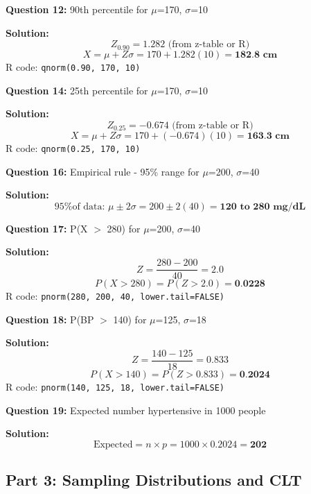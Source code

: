 \documentclass[11pt]{article}
\begin{document}
\textbf{Question 12:} 90th percentile for $\mu$=170, $\sigma$=10

\textcolor{correctgreen}{\textbf{Solution:}}
$$Z_{0.90} = 1.282 \text{ (from z-table or R)}$$
$$X = \mu + Z\sigma = 170 + 1.282(10) = \textbf{182.8 cm}$$
R code: \texttt{qnorm(0.90, 170, 10)}

\vspace{0.5cm}

\textbf{Question 14:} 25th percentile for $\mu$=170, $\sigma$=10

\textcolor{correctgreen}{\textbf{Solution:}}
$$Z_{0.25} = -0.674 \text{ (from z-table or R)}$$
$$X = \mu + Z\sigma = 170 + (-0.674)(10) = \textbf{163.3 cm}$$
R code: \texttt{qnorm(0.25, 170, 10)}

\vspace{0.5cm}

\textbf{Question 16:} Empirical rule - 95\% range for $\mu$=200, $\sigma$=40

\textcolor{correctgreen}{\textbf{Solution:}}
$$\text{95\% of data: } \mu \pm 2\sigma = 200 \pm 2(40) = \textbf{120 to 280 mg/dL}$$

\vspace{0.5cm}

\textbf{Question 17:} P(X $>$ 280) for $\mu$=200, $\sigma$=40

\textcolor{correctgreen}{\textbf{Solution:}}
$$Z = \frac{280-200}{40} = 2.0$$
$$P(X > 280) = P(Z > 2.0) = \textbf{0.0228}$$
R code: \texttt{pnorm(280, 200, 40, lower.tail=FALSE)}

\vspace{0.5cm}

\textbf{Question 18:} P(BP $>$ 140) for $\mu$=125, $\sigma$=18

\textcolor{correctgreen}{\textbf{Solution:}}
$$Z = \frac{140-125}{18} = 0.833$$
$$P(X > 140) = P(Z > 0.833) = \textbf{0.2024}$$
R code: \texttt{pnorm(140, 125, 18, lower.tail=FALSE)}

\vspace{0.5cm}

\textbf{Question 19:} Expected number hypertensive in 1000 people

\textcolor{correctgreen}{\textbf{Solution:}}
$$\text{Expected} = n \times p = 1000 \times 0.2024 = \textbf{202}$$

\subsection*{Part 3: Sampling Distributions and CLT}
\end{document}
